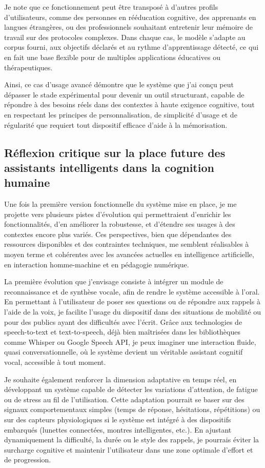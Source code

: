\documentclass[11pt,a4paper]{report}
\begin{document}
Je note que ce fonctionnement peut être transposé à d’autres profils d’utilisateurs, comme des personnes en rééducation cognitive, des apprenants en langues étrangères, ou des professionnels souhaitant entretenir leur mémoire de travail sur des protocoles complexes. Dans chaque cas, le modèle s’adapte au corpus fourni, aux objectifs déclarés et au rythme d’apprentissage détecté, ce qui en fait une base flexible pour de multiples applications éducatives ou thérapeutiques.

Ainsi, ce cas d’usage avancé démontre que le système que j’ai conçu peut dépasser le stade expérimental pour devenir un outil structurant, capable de répondre à des besoins réels dans des contextes à haute exigence cognitive, tout en respectant les principes de personnalisation, de simplicité d’usage et de régularité que requiert tout dispositif efficace d’aide à la mémorisation.

\subsection{Réflexion critique sur la place future des assistants intelligents dans la cognition humaine}

Une fois la première version fonctionnelle du système mise en place, je me projette vers plusieurs pistes d’évolution qui permettraient d’enrichir les fonctionnalités, d’en améliorer la robustesse, et d’étendre ses usages à des contextes encore plus variés. Ces perspectives, bien que dépendantes des ressources disponibles et des contraintes techniques, me semblent réalisables à moyen terme et cohérentes avec les avancées actuelles en intelligence artificielle, en interaction homme-machine et en pédagogie numérique.

La première évolution que j’envisage consiste à intégrer un module de reconnaissance et de synthèse vocale, afin de rendre le système accessible à l’oral. En permettant à l’utilisateur de poser ses questions ou de répondre aux rappels à l’aide de la voix, je facilite l’usage du dispositif dans des situations de mobilité ou pour des publics ayant des difficultés avec l’écrit. Grâce aux technologies de speech-to-text et text-to-speech, déjà bien maîtrisées dans les bibliothèques comme Whisper ou Google Speech API, je peux imaginer une interaction fluide, quasi conversationnelle, où le système devient un véritable assistant cognitif vocal, accessible à tout moment.

Je souhaite également renforcer la dimension adaptative en temps réel, en développant un système capable de détecter les variations d’attention, de fatigue ou de stress au fil de l’utilisation. Cette adaptation pourrait se baser sur des signaux comportementaux simples (temps de réponse, hésitations, répétitions) ou sur des capteurs physiologiques si le système est intégré à des dispositifs embarqués (lunettes connectées, montres intelligentes, etc.). En ajustant dynamiquement la difficulté, la durée ou le style des rappels, je pourrais éviter la surcharge cognitive et maintenir l’utilisateur dans une zone optimale d’effort et de progression.
\end{document}
